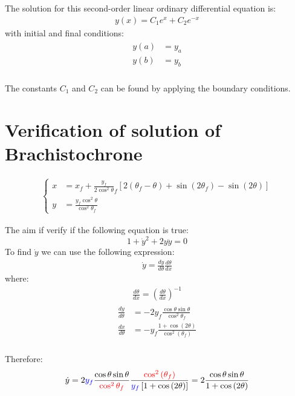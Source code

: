 \documentclass{article}
\begin{document}
The solution for this second-order linear ordinary differential equation is:
\begin{eqnarray*}
y(x) = C_1 e^x + C_2 e^{-x}
\end{eqnarray*}
with initial and final conditions:
\begin{eqnarray*}
\begin{split}
y(a) &= y_a \\
y(b) &= y_b \\
\end{split}
\end{eqnarray*}

The constants $C_1$ and $C_2$ can be found by applying the boundary conditions.

\section{Verification of solution of Brachistochrone} 

\begin{eqnarray*}
\left \{
\begin{split}
x &= x_f +\frac{y_f}{2\cos^2\theta}_f [2(\theta_f-\theta) +\sin(2\theta_f)-\sin(2\theta)] \\
y &= \frac{y_f \cos^2\theta}{\cos^2\theta_f}
\end{split}
\right .
\end{eqnarray*}

The aim if verify if the following equation is true:
\begin{equation}
1+\dot{y}^2+2y\ddot{y} = 0
\end{equation}
To find $\dot{y}$ we can use the following expression:
\begin{eqnarray*}
\dot{y} = \frac{dy}{d\theta}\frac{d\theta}{dx}
\end{eqnarray*}
where:
\begin{eqnarray*}
\frac{d\theta}{dx} = {\left( \frac{d\theta}{dx} \right)}^{-1}
\end{eqnarray*}
\begin{eqnarray*}
\begin{split}
\frac{dy}{d\theta} &= -2y_f \frac{\cos\theta\sin\theta}{\cos^2\theta_f}\\
\frac{dx}{d\theta} &= -y_f\frac{1+\cos\left(2\theta\right)}{\cos^2\left(\theta_f\right)}\\
\end{split}
\end{eqnarray*}

Therefore:
\begin{eqnarray}
\dot{y} = 2\textcolor{blue}{y_f} \frac{\cos\theta\sin\theta}{\textcolor{red}{\cos^2\theta_f}}\frac{ \textcolor{red}{\cos^2\left(\theta_f\right)}}{\textcolor{blue}{y_f} \left[1+\cos\left(2\theta\right)\right]} = 2\frac{\cos\theta\sin\theta}{1+\cos\left(2\theta\right)}
\end{eqnarray}
\end{document}
